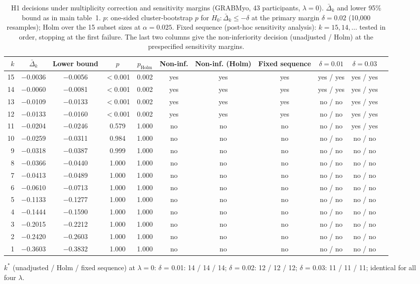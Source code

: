 \begin{table}[htbp]
\centering
\small
\caption{H1 decisions under multiplicity correction and sensitivity margins (GRABMyo, 43 participants, $\lambda = 0$). $\bar\Delta_k$ and lower 95\% bound as in main table~1. $p$: one-sided cluster-bootstrap $p$ for $H_0\colon \bar\Delta_k \le -\delta$ at the primary margin $\delta = 0.02$ (10,000 resamples); Holm over the 15 subset sizes at $\alpha = 0.025$. Fixed sequence (post-hoc sensitivity analysis): $k = 15, 14, \ldots$ tested in order, stopping at the first failure. The last two columns give the non-inferiority decision (unadjusted / Holm) at the prespecified sensitivity margins.}
\label{tab:h1_holm}
\setlength{\tabcolsep}{4pt}
\begin{adjustbox}{max width=\textwidth}
\begin{tabular}{rcccccccccc}
\toprule
$k$ & $\bar\Delta_k$ & Lower bound & $p$ & $p_{\mathrm{Holm}}$ & Non-inf. & Non-inf. (Holm) & Fixed sequence & $\delta = 0.01$ & $\delta = 0.03$ \\
\midrule
15 & $-$0.0036 & $-$0.0056 & $<$0.001 & 0.002 & yes & yes & yes & yes / yes & yes / yes \\
14 & $-$0.0060 & $-$0.0081 & $<$0.001 & 0.002 & yes & yes & yes & yes / yes & yes / yes \\
13 & $-$0.0109 & $-$0.0133 & $<$0.001 & 0.002 & yes & yes & yes & no / no & yes / yes \\
12 & $-$0.0133 & $-$0.0160 & $<$0.001 & 0.002 & yes & yes & yes & no / no & yes / yes \\
11 & $-$0.0204 & $-$0.0246 & 0.579 & 1.000 & no & no & no & no / no & yes / yes \\
10 & $-$0.0259 & $-$0.0311 & 0.984 & 1.000 & no & no & no & no / no & no / no \\
9 & $-$0.0318 & $-$0.0387 & 0.999 & 1.000 & no & no & no & no / no & no / no \\
8 & $-$0.0366 & $-$0.0440 & 1.000 & 1.000 & no & no & no & no / no & no / no \\
7 & $-$0.0413 & $-$0.0489 & 1.000 & 1.000 & no & no & no & no / no & no / no \\
6 & $-$0.0610 & $-$0.0713 & 1.000 & 1.000 & no & no & no & no / no & no / no \\
5 & $-$0.1133 & $-$0.1277 & 1.000 & 1.000 & no & no & no & no / no & no / no \\
4 & $-$0.1444 & $-$0.1590 & 1.000 & 1.000 & no & no & no & no / no & no / no \\
3 & $-$0.2015 & $-$0.2212 & 1.000 & 1.000 & no & no & no & no / no & no / no \\
2 & $-$0.2420 & $-$0.2603 & 1.000 & 1.000 & no & no & no & no / no & no / no \\
1 & $-$0.3603 & $-$0.3832 & 1.000 & 1.000 & no & no & no & no / no & no / no \\
\bottomrule
\end{tabular}
\end{adjustbox}
\par\smallskip\parbox{0.95\linewidth}{\footnotesize $k^*$ (unadjusted / Holm / fixed sequence) at $\lambda = 0$: $\delta$ = 0.01: 14 / 14 / 14; $\delta$ = 0.02: 12 / 12 / 12; $\delta$ = 0.03: 11 / 11 / 11; identical for all four $\lambda$.}
\end{table}
